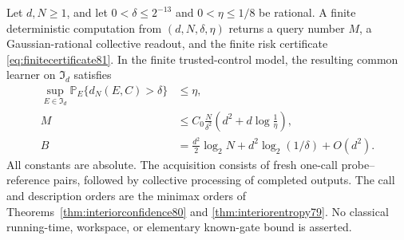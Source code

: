 \begin{theorem}
\label{thm:rationallearner81}
Let $d,N\ge1$, and let $0<\delta\le2^{-13}$ and
$0<\eta\le1/8$ be rational.  A finite deterministic computation
from $(d,N,\delta,\eta)$ returns a query number $M$, a
Gaussian-rational collective readout, and the finite risk certificate
\eqref{eq:finitecertificate81}.  In the finite trusted-control model,
the resulting common learner on $\mathfrak I_d$ satisfies
\begin{align}
 \sup_{E\in\mathfrak I_d}
       \mathbb P_E\{d_N(E,C)>\delta\}&\le\eta,
                                         \label{eq:certifiedactual81}\\
 M&\le C_0\frac{N}{\delta^2}
              \left(d^2+d\log\frac1\eta\right),
                                         \label{eq:certifiedcalls81}\\
 B&=\frac{d^2}{2}\log_2N+d^2\log_2(1/\delta)+O(d^2).
                                         \label{eq:certifiedbits81}
\end{align}
All constants are absolute.  The acquisition consists of fresh
one-call probe--reference pairs, followed by collective processing
of completed outputs.  The call and description orders are the
minimax orders of Theorems~\ref{thm:interiorconfidence80} and
\ref{thm:interiorentropy79}.  No classical running-time, workspace,
or elementary known-gate bound is asserted.
\end{theorem}
